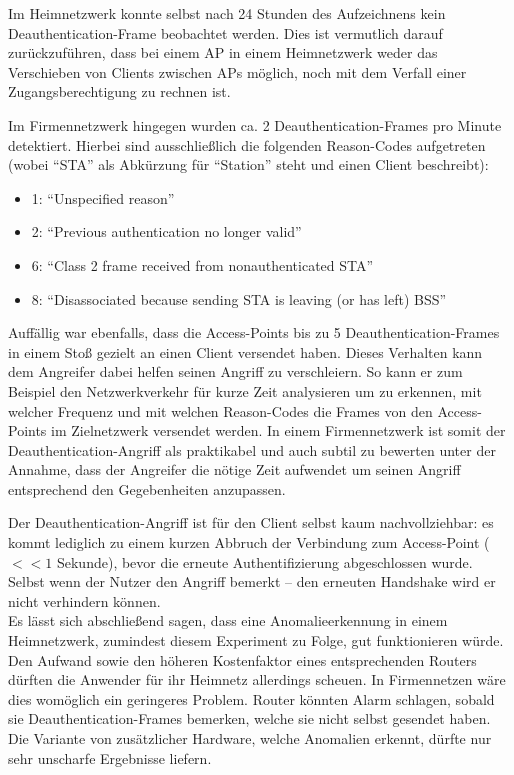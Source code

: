Im Heimnetzwerk konnte selbst nach 24 Stunden des Aufzeichnens kein Deauthentication-Frame beobachtet werden. Dies ist vermutlich darauf zurückzuführen, dass bei einem AP in einem Heimnetzwerk weder das Verschieben von Clients zwischen APs möglich, noch mit dem Verfall einer Zugangsberechtigung zu rechnen ist.

Im Firmennetzwerk hingegen wurden ca. 2 Deauthentication-Frames pro Minute detektiert.
Hierbei sind ausschließlich die folgenden Reason-Codes aufgetreten (wobei \enquote{STA} als Abkürzung für \enquote{Station} steht und einen Client beschreibt):
\begin{itemize}
	\item 1: \enquote{Unspecified reason}
	\item 2: \enquote{Previous authentication no longer valid}
	\item 6: \enquote{Class 2 frame received from nonauthenticated STA}
	\item 8: \enquote{Disassociated because sending STA is leaving (or has left) BSS}
\end{itemize}
Auffällig war ebenfalls, dass die Access-Points bis zu 5 Deauthentication-Frames in einem Stoß gezielt an einen Client versendet haben.
Dieses Verhalten kann dem Angreifer dabei helfen seinen Angriff zu verschleiern.
So kann er zum Beispiel den Netzwerkverkehr für kurze Zeit analysieren um zu erkennen, mit welcher Frequenz und mit welchen Reason-Codes die Frames von den Access-Points im Zielnetzwerk versendet werden.
In einem Firmennetzwerk ist somit der Deauthentication-Angriff als praktikabel und auch subtil zu bewerten unter der Annahme, dass der Angreifer die nötige Zeit aufwendet um seinen Angriff entsprechend den Gegebenheiten anzupassen.

Der Deauthentication-Angriff ist für den Client selbst kaum nachvollziehbar: es kommt lediglich zu einem kurzen Abbruch der Verbindung zum Access-Point ($<< 1$ Sekunde), bevor die erneute Authentifizierung abgeschlossen wurde. Selbst wenn der Nutzer den Angriff bemerkt -- den erneuten Handshake wird er nicht verhindern können.\\

Es lässt sich abschließend sagen, dass eine Anomalieerkennung in einem Heimnetzwerk, zumindest diesem Experiment zu Folge, gut funktionieren würde. Den Aufwand sowie den höheren Kostenfaktor eines entsprechenden Routers dürften die Anwender für ihr Heimnetz allerdings scheuen. In Firmennetzen wäre dies womöglich ein geringeres Problem. Router könnten Alarm schlagen, sobald sie Deauthentication-Frames bemerken, welche sie nicht selbst gesendet haben. Die Variante von zusätzlicher Hardware, welche Anomalien erkennt, dürfte nur sehr unscharfe Ergebnisse liefern.\\

